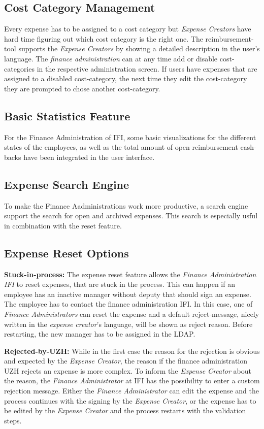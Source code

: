 \subsection{Cost Category Management}
Every expense has to be assigned to a cost category but \textit{Expense Creators} have hard time figuring out which cost category is the right one. The reimbursement-tool supports the\textit{ Expense Creators }by showing a detailed description in the user's language. The \textit{finance administration} can at any time add or disable cost-categories in the respective administration screen. If users have expenses that are assigned to a disabled cost-category, the next time they edit the cost-category they are prompted to chose another cost-category.

\subsection{Basic Statistics Feature}
For the Finance Administration of IFI, some basic visualizations for the different states of the employees, as well as the total amount of open reimbursement cash-backs have been integrated in the user interface.

\subsection{Expense Search Engine}
To make the Finance Aadministrations work more productive, a search engine support the search for open and archived expenses. This search is especially usful in combination with the reset feature.

\subsection{Expense Reset Options}
\textbf{Stuck-in-process:} The expense reset feature allows the \textit{Finance Administration IFI} to reset expenses, that are stuck in the process. This can happen if an employee has an inactive manager without deputy that should sign an expense. The employee has to contact the finance administration IFI. In this case, one of \textit{Finance Administrators} can reset the expense and a default reject-message, nicely written in the \textit{expense creator}'s language, will be shown as reject reason. Before restarting, the new manager has to be assigned in the LDAP. \par

\textbf{Rejected-by-UZH:} While in the first case the reason for the rejection is obvious and expected by the \textit{Expense Creator}, the reason if the finance administration UZH rejects an expense is more complex. To inform the \textit{Expense Creator} about the reason, the \textit{Finance Administrator} at IFI has the possibility to enter a custom rejection message. Either the \textit{Finance Administrator} can edit the expense and the process continues with the signing by the \textit{Expense Creator}, or the expense has to be edited by the \textit{Expense Creator} and the process restarts with the validation steps.

